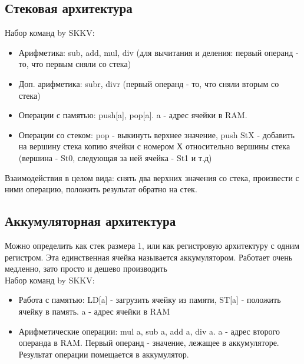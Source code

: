 \documentclass[12pt, a4paper]{article}
\begin{document}
\subsection{Стековая архитектура}
Набор команд by SKKV:
\begin{itemize}
    \item Арифметика: sub, add, mul, div (для вычитания и деления: первый операнд - то, что первым сняли со стека)
    \item Доп. арифметика: subr, divr (первый операнд - то, что сняли вторым со стека)
    \item Операции с памятью: push[a], pop[a]. a - адрес ячейки в RAM.
    \item Операции со стеком: pop - выкинуть верхнее значение, push StX - добавить на вершину стека копию ячейки с номером Х относительно вершины стека (вершина - St0, следующая за ней ячейка - St1 и т.д)
\end{itemize}
Взаимодействия в целом вида: снять два верхних значения со стека, произвести с ними операцию, положить результат обратно на стек.
\subsection{Аккумуляторная архитектура}
Можно определить как стек размера 1, или как регистровую архитектуру с одним регистром. Эта единственная ячейка называется аккумулятором. Работает очень медленно, зато просто и дешево производить\\
Набор команд by SKKV:
\begin{itemize}
    \item Работа с памятью: LD[a] - загрузить ячейку из памяти, ST[a] - положить ячейку в память. a - адрес ячейки в RAM
    \item Арифметические операции: mul a, sub a, add a, div a. a - адрес второго операнда в RAM. Первый операнд - значение, лежащее в аккумуляторе. Результат операции помещается в аккумулятор.
\end{itemize}
\end{document}
